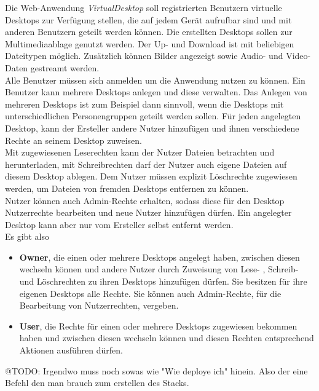 \documentclass[a4paper, 12pt]{scrreprt}
\renewcommand\_{\textunderscore\allowbreak}
\begin{document}
Die Web-Anwendung \textit{VirtualDesktop} soll registrierten Benutzern virtuelle Desktops zur Verfügung stellen, die auf jedem Gerät aufrufbar sind und mit anderen Benutzern geteilt werden können. Die erstellten Desktops sollen zur Multimediaablage genutzt werden. Der Up- und Download ist mit beliebigen Dateitypen möglich. Zusätzlich können Bilder angezeigt sowie Audio- und Video-Daten gestreamt werden.\\[0.25cm]
Alle Benutzer müssen sich anmelden um die Anwendung nutzen zu können. Ein Benutzer kann mehrere Desktops anlegen und diese verwalten. Das Anlegen von mehreren Desktops ist zum Beispiel dann sinnvoll, wenn die Desktops mit unterschiedlichen Personengruppen geteilt werden sollen.
Für jeden angelegten Desktop, kann der Ersteller andere Nutzer hinzufügen und ihnen verschiedene Rechte an seinem Desktop zuweisen.\\
Mit zugewiesenen Leserechten kann der Nutzer Dateien betrachten und herunterladen, mit Schreibrechten darf der Nutzer auch eigene Dateien auf diesem Desktop ablegen. Dem Nutzer müssen explizit Löschrechte zugewiesen werden, um Dateien von fremden Desktops entfernen zu können.\\
Nutzer können auch Admin-Rechte erhalten, sodass diese für den Desktop Nutzerrechte bearbeiten und neue Nutzer hinzufügen dürfen. Ein angelegter Desktop kann aber nur vom Ersteller selbst entfernt werden.\\ 
Es gibt also
\begin{itemize} 
\item[] \textbf{Owner}, die einen oder mehrere Desktops angelegt haben, zwischen diesen wechseln können und andere Nutzer durch Zuweisung von Lese- , Schreib- und Löschrechten zu ihren Desktops hinzufügen dürfen. Sie besitzen für ihre eigenen Desktops alle Rechte. Sie können auch Admin-Rechte, für die Bearbeitung von Nutzerrechten, vergeben.
\item[] \textbf{User}, die Rechte für einen oder mehrere Desktops zugewiesen bekommen haben und zwischen diesen wechseln können und diesen Rechten entsprechend Aktionen ausführen dürfen.
\end{itemize} 

@TODO: Irgendwo muss noch sowas wie "Wie deploye ich" hinein. Also der eine Befehl den man brauch zum erstellen des Stacks.
\end{document}
